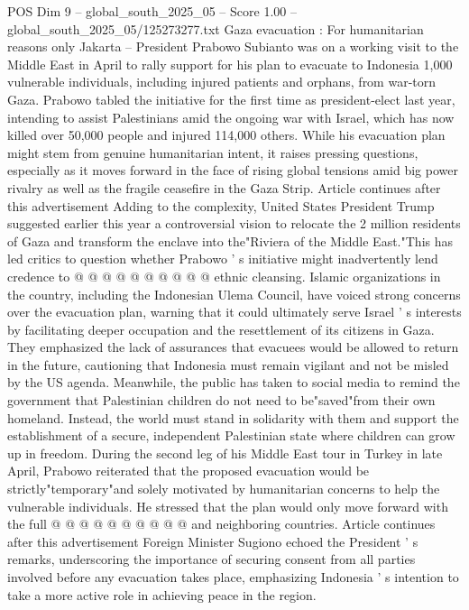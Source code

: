 \begin{textsample}{POS Dim 9 – global\_south\_2025\_05 – Score 1.00 – global\_south\_2025\_05/125273277.txt}  \label{ex:f9_pos_222}
Gaza evacuation : For humanitarian reasons only Jakarta -- President Prabowo Subianto was on a working visit to the Middle East in April to rally support for his plan to evacuate to Indonesia 1,000 vulnerable individuals, including injured patients and orphans, from war-torn Gaza.
Prabowo tabled the initiative for the first time as president-elect last year, intending to assist Palestinians amid the ongoing war with Israel, which has now killed over 50,000 people and injured 114,000 others.
While his evacuation plan might stem from genuine humanitarian intent, it raises pressing questions, especially as it moves forward in the face of rising global tensions amid big power rivalry as well as the fragile ceasefire in the Gaza Strip.
Article continues after this advertisement Adding to the complexity, United States President Trump suggested earlier this year a controversial vision to relocate the 2 million residents of Gaza and transform the enclave into the"Riviera of the Middle East."This has led critics to question whether Prabowo ' s initiative might inadvertently lend credence to @ @ @ @ @ @ @ @ @ @ ethnic cleansing.
Islamic organizations in the country, including the Indonesian Ulema Council, have voiced strong concerns over the evacuation plan, warning that it could ultimately serve Israel ' s interests by facilitating deeper occupation and the resettlement of its citizens in Gaza.
They emphasized the lack of assurances that evacuees would be allowed to return in the future, cautioning that Indonesia must remain vigilant and not be misled by the US agenda.
Meanwhile, the public has taken to social media to remind the government that Palestinian children do not need to be"saved"from their own homeland.
Instead, the world must stand in solidarity with them and support the establishment of a secure, independent Palestinian state where children can grow up in freedom.
During the second leg of his Middle East tour in Turkey in late April, Prabowo reiterated that the proposed evacuation would be strictly"temporary"and solely motivated by humanitarian concerns to help the vulnerable individuals.
He stressed that the plan would only move forward with the full @ @ @ @ @ @ @ @ @ @ and neighboring countries.
Article continues after this advertisement Foreign Minister Sugiono echoed the President ' s remarks, underscoring the importance of securing consent from all parties involved before any evacuation takes place, emphasizing Indonesia ' s intention to take a more active role in achieving peace in the region.

\end{textsample}
